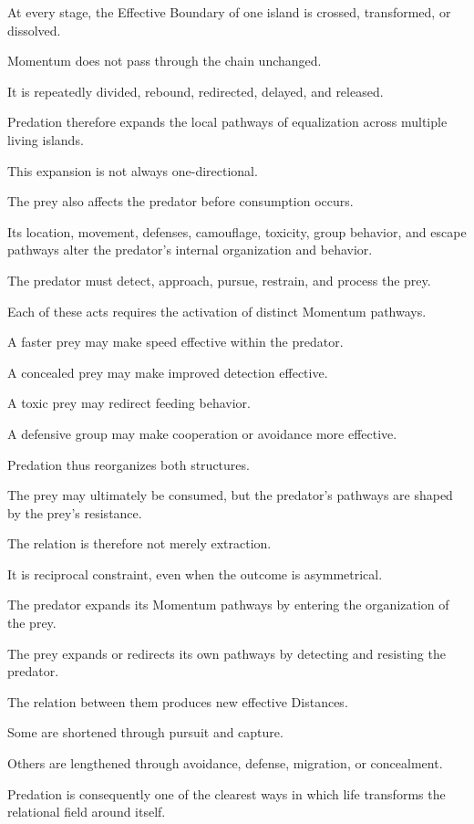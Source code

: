 At every stage, the Effective Boundary of one island is crossed, transformed, or dissolved.

Momentum does not pass through the chain unchanged.

It is repeatedly divided, rebound, redirected, delayed, and released.

Predation therefore expands the local pathways of equalization across multiple living islands.

This expansion is not always one-directional.

The prey also affects the predator before consumption occurs.

Its location, movement, defenses, camouflage, toxicity, group behavior, and escape pathways alter the predator’s internal organization and behavior.

The predator must detect, approach, pursue, restrain, and process the prey.

Each of these acts requires the activation of distinct Momentum pathways.

A faster prey may make speed effective within the predator.

A concealed prey may make improved detection effective.

A toxic prey may redirect feeding behavior.

A defensive group may make cooperation or avoidance more effective.

Predation thus reorganizes both structures.

The prey may ultimately be consumed, but the predator’s pathways are shaped by the prey’s resistance.

The relation is therefore not merely extraction.

It is reciprocal constraint, even when the outcome is asymmetrical.

The predator expands its Momentum pathways by entering the organization of the prey.

The prey expands or redirects its own pathways by detecting and resisting the predator.

The relation between them produces new effective Distances.

Some are shortened through pursuit and capture.

Others are lengthened through avoidance, defense, migration, or concealment.

Predation is consequently one of the clearest ways in which life transforms the relational field around itself.

